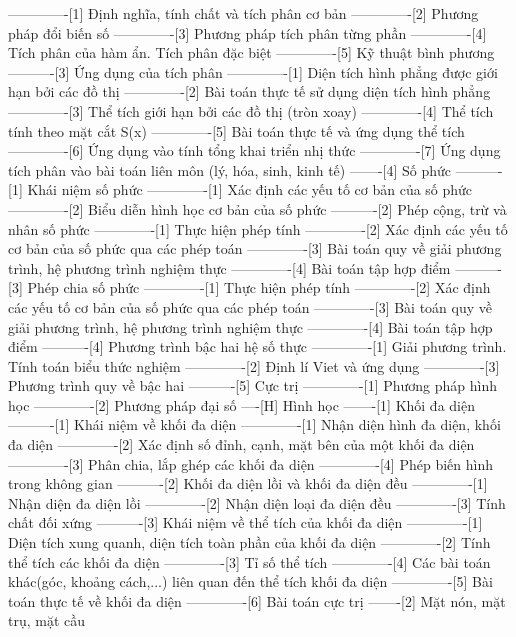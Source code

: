-------------[1] Định nghĩa, tính chất và tích phân cơ bản
-------------[2] Phương pháp đổi biến số
-------------[3] Phương pháp tích phân từng phần
-------------[4] Tích phân của hàm ẩn. Tích phân đặc biệt
-------------[5] Kỹ thuật bình phương
----------[3] Ứng dụng của tích phân
-------------[1] Diện tích hình phẳng được giới hạn bởi các đồ thị
-------------[2] Bài toán thực tế sử dụng diện tích hình phẳng
-------------[3] Thể tích giới hạn bởi các đồ thị (tròn xoay)
-------------[4] Thể tích tính theo mặt cắt S(x)
-------------[5] Bài toán thực tế và ứng dụng thể tích
-------------[6] Ứng dụng vào tính tổng khai triển nhị thức
-------------[7] Ứng dụng tích phân vào bài toán liên môn (lý, hóa, sinh, kinh tế)
-------[4] Số phức
----------[1] Khái niệm số phức
-------------[1] Xác định các yếu tố cơ bản của số phức
-------------[2] Biểu diễn hình học cơ bản của số phức
----------[2] Phép cộng, trừ và nhân số phức
-------------[1] Thực hiện phép tính
-------------[2] Xác định các yếu tố cơ bản của số phức qua các phép toán
-------------[3] Bài toán quy về giải phương trình, hệ phương trình nghiệm thực
-------------[4] Bài toán tập hợp điểm
----------[3] Phép chia số phức
-------------[1] Thực hiện phép tính
-------------[2] Xác định các yếu tố cơ bản của số phức qua các phép toán
-------------[3] Bài toán quy về giải phương trình, hệ phương trình nghiệm thực
-------------[4] Bài toán tập hợp điểm
----------[4] Phương trình bậc hai hệ số thực
-------------[1] Giải phương trình. Tính toán biểu thức nghiệm
-------------[2] Định lí Viet và ứng dụng
-------------[3] Phương trình quy về bậc hai
----------[5] Cực trị
-------------[1] Phương pháp hình học
-------------[2] Phương pháp đại số
----[H] Hình học
-------[1] Khối đa diện
----------[1] Khái niệm về khối đa diện
-------------[1] Nhận diện hình đa diện, khối đa diện
-------------[2] Xác định số đỉnh, cạnh, mặt bên của một khối đa diện
-------------[3] Phân chia, lắp ghép các khối đa diện
-------------[4] Phép biến hình trong không gian
----------[2] Khối đa diện lồi và khối đa diện đều
-------------[1] Nhận diện đa diện lồi
-------------[2] Nhận diện loại đa diện đều
-------------[3] Tính chất đối xứng
----------[3] Khái niệm về thể tích của khối đa diện
-------------[1] Diện tích xung quanh, diện tích toàn phần của khối đa diện
-------------[2] Tính thể tích các khối đa diện
-------------[3] Tỉ số thể tích
-------------[4] Các bài toán khác(góc, khoảng cách,...) liên quan đến thể tích khối đa diện
-------------[5] Bài toán thực tế về khối đa diện
-------------[6] Bài toán cực trị
-------[2] Mặt nón, mặt trụ, mặt cầu

